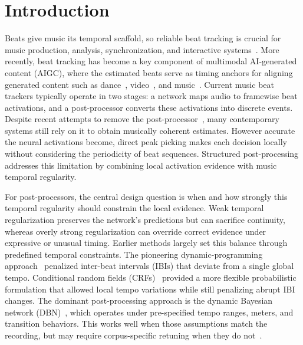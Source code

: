 \documentclass{article}
\begin{document}
\section{Introduction}
\label{sec:intro}
Beats give music its temporal scaffold, so reliable beat tracking is crucial for music production, analysis, synchronization, and interactive systems~\cite{purwins2019deep}. More recently, beat tracking has become a key component of multimodal AI-generated content (AIGC), where the estimated beats serve as timing anchors for aligning generated content such as dance~\cite{tseng2023edge, huang2024beatit}, video~\cite{yu2023loris, tong2026vem}, and music~\cite{lan2024musicongen, chen2024musicldm}. Current music beat trackers typically operate in two stages: a network maps audio to framewise beat activations, and a post-processor converts these activations into discrete events. Despite recent attempts to remove the post-processor~\cite{chen2022postprocessingfree, foscarin2024beat, bolt2026reformulated}, many contemporary systems \cite{deng2024efficient, ru2025hingenet, ru2025beatfm, ru2026beatmamba, zhang2025beatkan} still rely on it to obtain musically coherent estimates. However accurate the neural activations become, direct peak picking makes each decision locally without considering the periodicity of beat sequences. Structured post-processing addresses this limitation by combining local activation evidence with music temporal regularity.


For post-processors, the central design question is when and how strongly this temporal regularity should constrain the local evidence. Weak temporal regularization preserves the network's predictions but can sacrifice continuity, whereas overly strong regularization can override correct evidence under expressive or unusual timing. Earlier methods largely set this balance through predefined temporal constraints. The pioneering dynamic-programming approach~\cite{ellis2007beattracking} penalized inter-beat intervals (IBIs) that deviate from a single global tempo. Conditional random fields (CRFs)~\cite{fillon2015crf} provided a more flexible probabilistic formulation that allowed local tempo variations while still penalizing abrupt IBI changes. The dominant post-processing approach is the dynamic Bayesian network (DBN)~\cite{krebs2015dbn}, which operates under pre-specified tempo ranges, meters, and transition behaviors. This works well when those assumptions match the recording, but may require corpus-specific retuning when they do not~\cite{ahn2026smcblindspot}.
\end{document}
